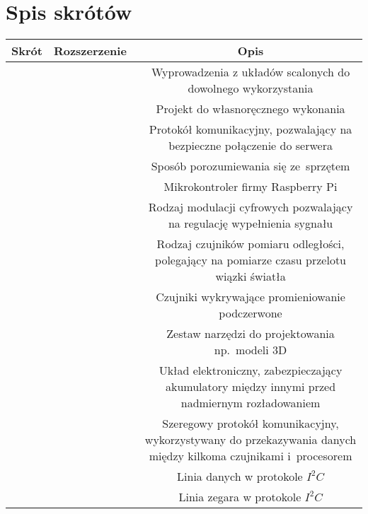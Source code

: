 \section*{Spis skrótów}
\begin{table*}[!ht]
    \begin{tabularx}{\textwidth}{|c|C|C|}\hline
        Skrót & Rozszerzenie\ & Opis\\\hline
               &  & Wyprowadzenia z układów scalonych do dowolnego wykorzystania\\\hline
                &  & Projekt do własnoręcznego wykonania\\\hline
                &  & Protokół komunikacyjny, pozwalający na bezpieczne połączenie do serwera\\\hline
                &  & Sposób porozumiewania się ze~sprzętem\\\hline
         &  & Mikrokontroler firmy Raspberry Pi\\\hline
                &  & Rodzaj modulacji cyfrowych pozwalający na regulację wypełnienia sygnału\\\hline
                &  & Rodzaj czujników pomiaru odległości, polegający na pomiarze czasu przelotu wiązki światła\\\hline
                 &  & Czujniki wykrywające promieniowanie podczerwone\\\hline
                &  & Zestaw narzędzi do projektowania np.~modeli 3D\\\hline
                &  & Układ elektroniczny, zabezpieczający akumulatory między innymi przed nadmiernym rozładowaniem\\\hline
             &  & Szeregowy protokół komunikacyjny, wykorzystywany do przekazywania danych między kilkoma czujnikami i~procesorem\\\hline
              &  & Linia danych w protokole $I^2C$\\\hline
              &  & Linia zegara w protokole $I^2C$\\\hline
    \end{tabularx}
\end{table*}